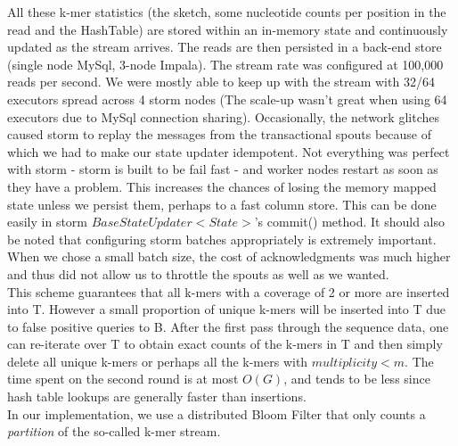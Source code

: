 \documentclass[11pt]{article}
\begin{document}
All these k-mer statistics (the sketch, some nucleotide counts per position in the read and the HashTable) are stored within an in-memory state and continuously updated as the stream arrives. The reads are then persisted in a back-end store (single node MySql, 3-node Impala). The stream rate was configured at 100,000 reads per second. We were mostly able to keep up with the stream with 32/64 executors spread across 4 storm nodes (The scale-up wasn't great when using 64 executors due to MySql connection sharing). Occasionally, the network glitches caused storm to replay the messages from the transactional spouts because of which we had to make our state updater idempotent. Not everything was perfect with storm - storm is built to be fail fast - and worker nodes restart as soon as they have a problem. This increases the chances of losing the memory mapped state unless we persist them, perhaps to a fast column store. This can be done easily in storm ${BaseStateUpdater<State>}$'s commit() method. It should also be noted that configuring storm batches appropriately is extremely important. When we chose a small batch size, the cost of acknowledgments was much higher and thus did not allow us to throttle the spouts as well as we wanted.\\

This scheme guarantees that all k-mers with a coverage of 2 or more are inserted into T. However a small proportion of unique k-mers will be inserted into T due to false positive queries to B. After the first pass through the sequence data, one can re-iterate over T to obtain exact counts of the k-mers in T and then simply delete all unique k-mers or perhaps all the k-mers with $multiplicity < m$. The time spent on the second round is at most $O(G)$, and tends to be less since hash table lookups are generally faster than insertions.\\

In our implementation, we use a distributed Bloom Filter that only counts a \emph{partition} of the so-called k-mer stream. 
\end{document}
